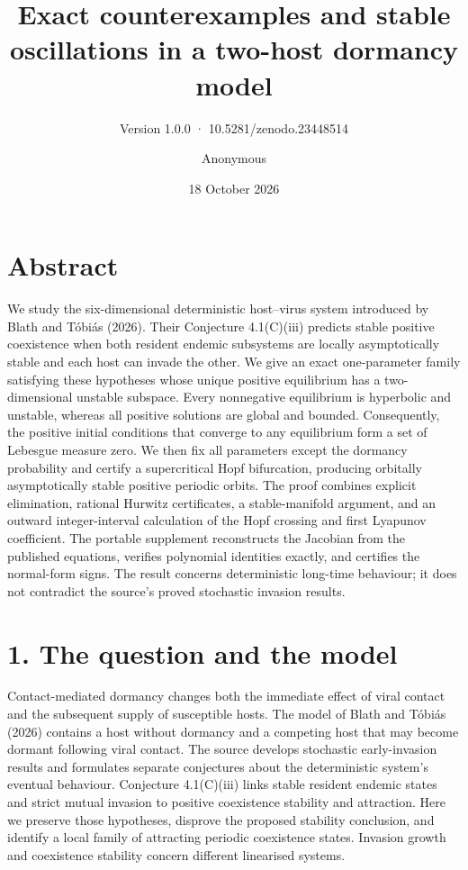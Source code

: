 \documentclass[
  11pt,
]{article}
\title{Exact counterexamples and stable oscillations in a two-host
dormancy model}
\subtitle{Version 1.0.0 · 10.5281/zenodo.23448514}
\author{Anonymous}
\date{18 October 2026}
\begin{document}
\maketitle

\section{Abstract}\label{abstract}

We study the six-dimensional deterministic host--virus system introduced
by Blath and Tóbiás (2026). Their Conjecture 4.1(C)(iii) predicts stable
positive coexistence when both resident endemic subsystems are locally
asymptotically stable and each host can invade the other. We give an
exact one-parameter family satisfying these hypotheses whose unique
positive equilibrium has a two-dimensional unstable subspace. Every
nonnegative equilibrium is hyperbolic and unstable, whereas all positive
solutions are global and bounded. Consequently, the positive initial
conditions that converge to any equilibrium form a set of Lebesgue
measure zero. We then fix all parameters except the dormancy probability
and certify a supercritical Hopf bifurcation, producing orbitally
asymptotically stable positive periodic orbits. The proof combines
explicit elimination, rational Hurwitz certificates, a stable-manifold
argument, and an outward integer-interval calculation of the Hopf
crossing and first Lyapunov coefficient. The portable supplement
reconstructs the Jacobian from the published equations, verifies
polynomial identities exactly, and certifies the normal-form signs. The
result concerns deterministic long-time behaviour; it does not
contradict the source's proved stochastic invasion results.

\section{1. The question and the
model}\label{the-question-and-the-model}

Contact-mediated dormancy changes both the immediate effect of viral
contact and the subsequent supply of susceptible hosts. The model of
Blath and Tóbiás (2026) contains a host without dormancy and a competing
host that may become dormant following viral contact. The source
develops stochastic early-invasion results and formulates separate
conjectures about the deterministic system's eventual behaviour.
Conjecture 4.1(C)(iii) links stable resident endemic states and strict
mutual invasion to positive coexistence stability and attraction. Here
we preserve those hypotheses, disprove the proposed stability
conclusion, and identify a local family of attracting periodic
coexistence states. Invasion growth and coexistence stability concern
different linearised systems.
\end{document}
